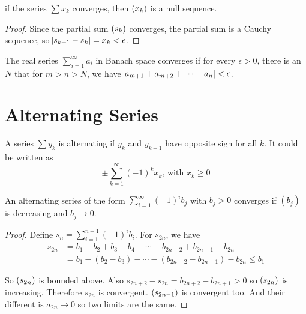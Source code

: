 \begin{theorem}
    if the series $\sum x_k$ converges, then $\sequence{x_k}$ is a null sequence.
\end{theorem}
\begin{proof}
    Since the partial sum $\sequence{s_k}$ converges, the partial sum is a Cauchy sequence, so $\abs{s_{k+1} - s_k} = x_k < \epsilon$.
\end{proof}


\begin{theorem}\label{cauchy_convergent_criterion}
    The real series $\sum_{i=1}^\infty a_i$ in Banach space converges if for every $\epsilon > 0$, there is an $N$ that for $m > n > N$, we have $\abs{a_{m+1} + a_{m+2} + \cdots + a_n} < \epsilon$.
\end{theorem}



\section{Alternating Series}

\begin{definition}
    A series $\sum y_k$ is alternating if $y_k$ and $y_{k+1}$ have opposite sign for all $k$. It could be written as
    \begin{equation}
        \pm \sum_{k=1}^\infty (-1)^k x_k \text{, with } x_k \geq 0
    \end{equation}
\end{definition}


\begin{theorem}
    An alternating series of the form $\sum_{i=1}^\infty (-1)^i b_j$ with $b_j > 0$ converges if $(b_j)$ is decreasing and $b_j \rightarrow 0$.
\end{theorem}
\begin{proof}
    Define $s_n = \sum_{i=1}^{n+1} (-1)^i b_i$. For $s_{2n}$, we have
    \begin{equation}
        \begin{aligned}
            s_{2n} &= b_1 - b_2 + b_3 - b_4 + \cdots -b_{2n-2} + b_{2n-1} - b_{2n} \\
            &= b_1 - (b_2 - b_3) - \cdots - (b_{2n-2} - b_{2n-1}) - b_{2n} \leq b_1
        \end{aligned}
    \end{equation}
    
    So $\sequence{s_{2n}}$ is bounded above. Also $s_{2n+2} - s_{2n} = b_{2n+2} - b_{2n+1} > 0$ so $\sequence{s_{2n}}$ is increasing. Therefore $s_{2n}$ is convergent. $\sequence{s_{2n-1}}$ is convergent too. And their different is $a_{2n} \rightarrow 0$ so two limits are the same.
\end{proof}




